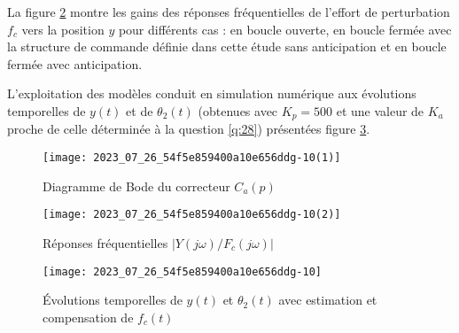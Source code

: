 La figure \ref{fig:17} montre les gains des réponses fréquentielles de l'effort de perturbation $f_{c}$ vers la position $y$ pour différents cas : en boucle ouverte, en boucle fermée avec la structure de commande définie dans cette étude sans anticipation et en boucle fermée avec anticipation.

L'exploitation des modèles conduit en simulation numérique aux évolutions temporelles de $y(t)$ et de $\theta_{2}(t)$ (obtenues avec $K_{p}=500$ et une valeur de $K_{a}$ proche de celle déterminée à la question \ref{q:28}) présentées figure \ref{fig:18}. 


\begin{figure}[!h]
\centering
\texttt{[image: 2023\_07\_26\_54f5e859400a10e656ddg-10(1)]}
\caption{\label{fig:16}Diagramme de Bode du correcteur $C_{a}(p)$}
\end{figure}


\begin{figure}[!h]
\centering
\texttt{[image: 2023\_07\_26\_54f5e859400a10e656ddg-10(2)]}
\caption{\label{fig:17}Réponses fréquentielles $\left|Y(j \omega) / F_{c}(j \omega)\right|$}
\end{figure}


\begin{figure}[!h]
\centering
\texttt{[image: 2023\_07\_26\_54f5e859400a10e656ddg-10]}
\caption{\label{fig:18}Évolutions temporelles de $y(t)$ et $\theta_{2}(t)$ avec estimation et compensation de $f_{c}(t)$}
\end{figure}

%